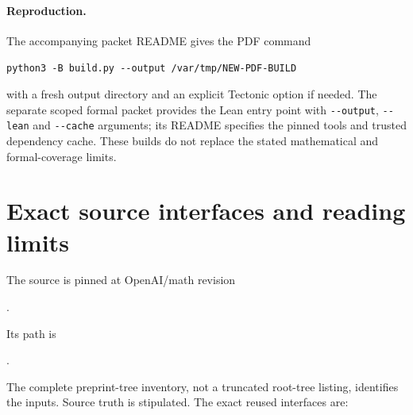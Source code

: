 \documentclass[11pt]{article}
\theoremstyle{remark}\newtheorem{remark}[theorem]{Remark}
\numberwithin{equation}{section}
\begin{document}
\paragraph{Reproduction.}
The accompanying packet README gives the PDF command
\begin{center}\small
\texttt{python3 -B build.py -{}-output /var/tmp/NEW-PDF-BUILD}
\end{center}
with a fresh output directory and an explicit Tectonic option if needed.
The separate scoped formal packet 
provides the Lean entry point with \texttt{-{}-output}, \texttt{-{}-lean}
and \texttt{-{}-cache} arguments; its README specifies the pinned tools
and trusted dependency cache. These builds do not replace the stated
mathematical and formal-coverage limits.

\appendix
\section{Exact source interfaces and reading limits}\label{sec:source}
The source \cite{source} is pinned at OpenAI/math revision
\begin{center}\small{}.\end{center}
Its path is
\begin{center}\small{}.\end{center}
The complete preprint-tree inventory, not a truncated root-tree listing,
identifies the inputs. Source truth is stipulated. The exact reused
interfaces are:
\end{document}
